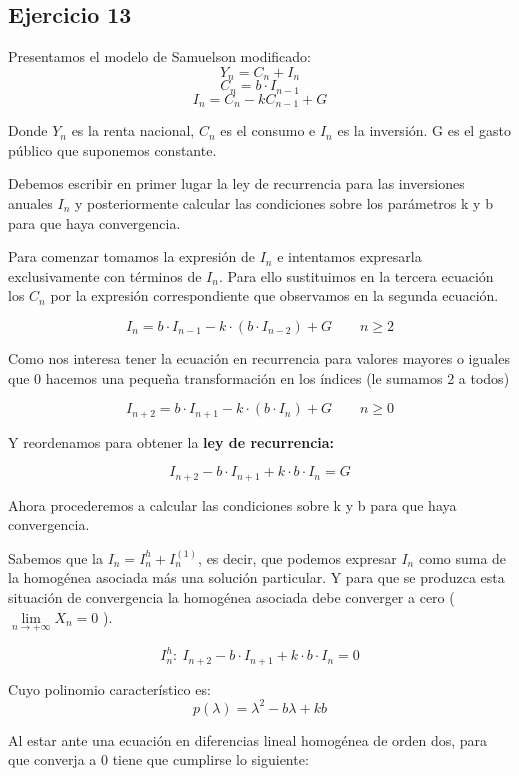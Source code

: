 \documentclass[11pt, a4paper]{article}
\newif\IfInSansMode
\numberwithin{equation}{section}
\theoremstyle{theorem-style}
\theoremstyle{definition-style}
\theoremstyle{remark-style}
\theoremstyle{example-style}
\begin{document}
    \subsection{Ejercicio 13}

    Presentamos el modelo de Samuelson modificado:
    $$Y_n = C_n + I_n$$
    $$C_n=b\cdot I_{n-1}$$
    $$I_n = C_n-kC_{n-1}+G$$

    Donde $Y_n$ es la renta nacional, $C_n$ es el consumo e $I_n$ es la inversión. G es el gasto público que suponemos constante.

    Debemos escribir en primer lugar la ley de recurrencia para las inversiones anuales $I_n$ y posteriormente calcular las condiciones sobre los parámetros k y b para que haya convergencia.

    Para comenzar tomamos la expresión de $I_n$ e intentamos expresarla exclusivamente con términos de $I_n$. Para ello sustituimos en la tercera ecuación los $C_n$ por la expresión correspondiente que observamos en la segunda ecuación.

    $$I_n = b\cdot I_{n-1}-k\cdot (b\cdot I_{n-2}) +G\quad \quad n \ge 2$$

    Como nos interesa tener la ecuación en recurrencia para valores mayores o iguales que 0 hacemos una pequeña transformación en los índices (le sumamos 2 a todos)

    $$I_{n+2} = b\cdot I_{n+1}-k\cdot (b\cdot I_{n}) +G\quad \quad n \ge 0$$

    Y reordenamos para obtener la \textbf{ley de recurrencia:}

    $$I_{n+2} - b\cdot I_{n+1} + k\cdot b\cdot I_{n} = G$$

    \newpage
    Ahora procederemos a calcular las condiciones sobre k y b para que haya convergencia.

    Sabemos que la $I_n = I_n^h+I_n^{(1)}$, es decir, que podemos expresar $I_n$ como suma de la homogénea asociada más una solución particular. Y para que se produzca esta situación de convergencia la homogénea asociada debe converger a cero ( $\lim \limits_{n \to +\infty} X_n = 0 $ ).

    $$I_n^h:\ I_{n+2} - b\cdot I_{n+1} + k\cdot b\cdot I_{n} = 0 $$

    Cuyo polinomio característico es:
    $$p(\lambda) = \lambda^2 - b\lambda + kb$$

    Al estar ante una ecuación en diferencias lineal homogénea de orden dos, para que converja a 0 tiene que cumplirse lo siguiente:
\end{document}
